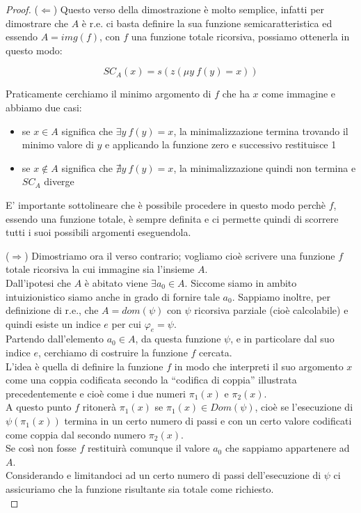 \begin{proof}

  ($\Leftarrow$) Questo verso della dimostrazione è molto semplice, infatti per dimostrare che $A$ è r.e.
  ci basta definire la sua funzione semicaratteristica ed essendo $A = img(f)$, con $f$ una funzione totale
  ricorsiva, possiamo ottenerla in questo modo:
  
  \[
    SC_A(x) = s(z(\mu y\ f(y) = x))
  \]

  Praticamente cerchiamo il minimo argomento di $f$ che ha $x$ come immagine e abbiamo due casi:
  \begin{itemize}
    \item se $x \in A$ significa che $\exists y\ f(y) = x$, la minimalizzazione termina trovando
      il minimo valore di $y$ e applicando la funzione zero e successivo restituisce 1
    \item se $x \notin A$ significa che $\nexists y\ f(y) = x$, la minimalizzazione quindi non termina
      e $SC_A$ diverge
  \end{itemize}

  E' importante sottolineare che è possibile procedere in questo modo perchè $f$, essendo una funzione totale, è
  sempre definita e ci permette quindi di scorrere tutti i suoi possibili argomenti eseguendola.

  ($\Rightarrow$) 
  Dimostriamo ora il verso contrario; vogliamo cioè scrivere una funzione $f$ totale ricorsiva la cui immagine sia l'insieme $A$.\\
  Dall'ipotesi che $A$ \`e abitato viene $\exists a_0 \in A$. Siccome siamo in ambito
  intuizionistico siamo anche in grado di fornire tale $a_0$. Sappiamo inoltre, per definizione di r.e., che $A = dom\left(\psi \right)$
  con $\psi$ ricorsiva parziale (cioè calcolabile) e quindi esiste un indice $e$ per cui $\varphi_e = \psi$.\\
  Partendo dall'elemento $a_0 \in A$, da questa funzione $\psi$, e in particolare dal suo indice $e$, cerchiamo di costruire la funzione $f$ cercata.\\

  L'idea è quella di definire la funzione $f$ in modo che interpreti il suo argomento $x$ come una coppia codificata secondo la 
  ``codifica di coppia'' illustrata precedentemente e cioè come i due numeri $\pi_1(x)$ e $\pi_2(x)$.\\
  A questo punto $f$ ritonerà $\pi_1(x)$ se $\pi_1(x) \in Dom(\psi)$, cioè se l'esecuzione di $\psi(\pi_1(x))$ termina in un certo
  numero di passi e con un certo valore codificati come coppia dal secondo numero $\pi_2(x)$.\\
  Se così non fosse $f$ restituirà comunque il valore $a_0$ che sappiamo appartenere ad $A$.\\
  Considerando e limitandoci ad un certo numero di passi dell'esecuzione di $\psi$ ci assicuriamo che la funzione risultante sia totale
  come richiesto.\\


\end{proof}

